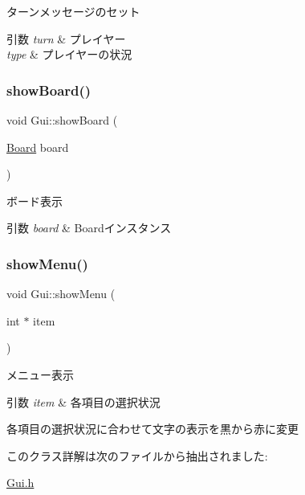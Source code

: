 ターンメッセージのセット 


\begin{DoxyParams}{引数}
{\em turn} & プレイヤー \\
\hline
{\em type} & プレイヤーの状況 \\
\hline
\end{DoxyParams}
\mbox{\label{class_gui_a24335264c09d1563075d98d2563cb186}} 
\subsubsection{\texorpdfstring{show\+Board()}{showBoard()}}
{\footnotesize\ttfamily void Gui\+::show\+Board (\begin{DoxyParamCaption}\item[{\mbox{\hyperlink{class_board}{Board}}}]{board }\end{DoxyParamCaption})\hspace{0.3cm}{\ttfamily [inline]}}



ボード表示 


\begin{DoxyParams}{引数}
{\em board} & Boardインスタンス \\
\hline
\end{DoxyParams}
\mbox{\label{class_gui_afb242c53d9727caf2f41ab66eaf60fe8}} 
\subsubsection{\texorpdfstring{show\+Menu()}{showMenu()}}
{\footnotesize\ttfamily void Gui\+::show\+Menu (\begin{DoxyParamCaption}\item[{int $\ast$}]{item }\end{DoxyParamCaption})\hspace{0.3cm}{\ttfamily [inline]}}



メニュー表示 


\begin{DoxyParams}{引数}
{\em item} & 各項目の選択状況\\
\hline
\end{DoxyParams}
各項目の選択状況に合わせて文字の表示を黒から赤に変更 

このクラス詳解は次のファイルから抽出されました\+:\begin{DoxyCompactItemize}
\item 
\mbox{\hyperlink{_gui_8h}{Gui.\+h}}\end{DoxyCompactItemize}
